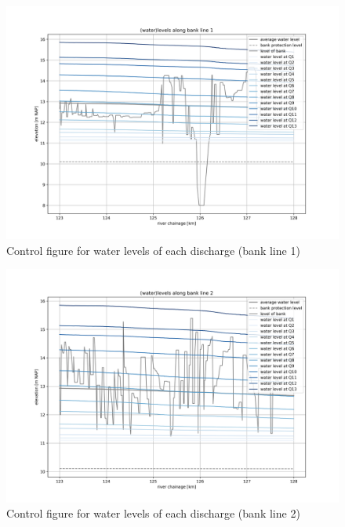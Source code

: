 \begin{figure}
\includegraphics[width=\textwidth]{figures/6_levels_bank_1.png}
\caption{Control figure for water levels of each discharge (bank line 1)}
\label{Fig2.8}
\end{figure}

\begin{figure}
\includegraphics[width=\textwidth]{figures/7_levels_bank_2.png}
\caption{Control figure for water levels of each discharge (bank line 2)}
\label{Fig2.9}
\end{figure}

